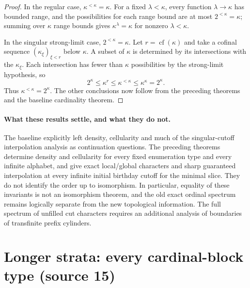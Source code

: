 \documentclass[11pt]{article}
\theoremstyle{definition}
\theoremstyle{remark}
\begin{document}
\begin{proof}
In the regular case, $\kappa^{<\kappa}=\kappa$.  For a fixed
$\lambda<\kappa$, every function $\lambda\to\kappa$ has bounded
range, and the possibilities for each range bound are at most
$2^{<\kappa}=\kappa$; summing over $\kappa$ range bounds gives
$\kappa^\lambda=\kappa$ for nonzero $\lambda<\kappa$.

In the singular strong-limit case, $2^{<\kappa}=\kappa$.  Let
$r=\operatorname{cf}(\kappa)$ and take a cofinal sequence
$(\kappa_\xi)_{\xi<r}$ below $\kappa$.  A subset of $\kappa$ is
determined by its intersections with the $\kappa_\xi$.  Each
intersection has fewer than $\kappa$ possibilities by the strong-limit
hypothesis, so
\[
 2^\kappa\leq\kappa^r
       \leq\kappa^{<\kappa}\leq\kappa^\kappa=2^\kappa.
\]
Thus $\kappa^{<\kappa}=2^\kappa$.  The other conclusions now follow
from the preceding theorems and the baseline cardinality theorem.
\end{proof}

\paragraph{What these results settle, and what they do not.}
The baseline explicitly left density, cellularity and much of the
singular-cutoff interpolation analysis as continuation questions.
The preceding theorems determine density and cellularity for every
fixed enumeration type and every infinite alphabet, and give exact
local/global characters and sharp guaranteed interpolation at every
infinite initial birthday cutoff for the minimal slice.  They do not
identify the order up to isomorphism.  In particular, equality of
these invariants is not an isomorphism theorem, and the old exact
ordinal spectrum remains logically separate from the new topological
information.  The full spectrum of unfilled cut characters requires
an additional analysis of boundaries of transfinite prefix cylinders.


\section{Longer strata: every cardinal-block type (source 15)}
\label{swo:cb:new:sec:block-types}\label{swo:cb:sec:fixed}
\end{document}
